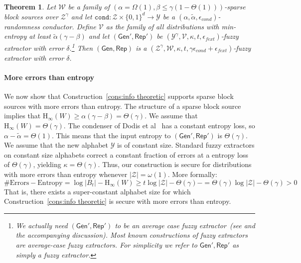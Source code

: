 \documentclass[11pt]{article}
\newtheorem{theorem}{Theorem}[section]
\newcommand{\consref}[1]{\mbox{Construction~\ref{#1}}}
\newcommand{\class}[1]{{\ensuremath{\mathsf{#1}}}}
\newcommand{\gen}{\ensuremath{\class{Gen}}\xspace}
\newcommand{\rep}{\ensuremath{\class{Rep}}\xspace}
\newcommand{\zo}{\ensuremath{\{0, 1\}}}
\newcommand{\Hoo}{\mathrm{H}_\infty}
\newcommand{\cond}{\ensuremath{\mathtt{cond}}}
\begin{document}
\begin{theorem}
\label{thm:info theory sec}
Let $\mathcal{W}$ be a family of $(\alpha = \Omega(1), \beta\leq \gamma(1-\Theta(1)))$-sparse block sources over $\mathcal{Z}^\gamma$ and let $\cond: \mathcal{Z} \times \zo^d\rightarrow \mathcal{Y}$ be a $(\alpha, \tilde{\alpha}, \epsilon_{cond})$-randomness conductor.  Define $\mathcal{V}$ as the family of all distributions with min-entropy at least $\tilde{\alpha}(\gamma-\beta)$ and let $(\gen', \rep')$ be $(\mathcal{Y}^\gamma, \mathcal{V}, \kappa, t, \epsilon_{fext})$-fuzzy extractor with error $\delta$.\footnote{We actually need $(\gen', \rep')$ to be an average case fuzzy extractor~(see \cite[Definition 4]{DBLP:journals/siamcomp/DodisORS08} and the accompanying discussion).  Most known constructions of fuzzy extractors are average-case fuzzy extractors.  For simplicity we refer to $\gen', \rep'$ as simply a fuzzy extractor.}  Then $(\gen, \rep)$ is a $(\mathcal{Z}^\gamma, \mathcal{W}, \kappa, t, \gamma\epsilon_{cond}+\epsilon_{fext})$-fuzzy extractor with error $\delta$.
\end{theorem}

\paragraph{More errors than entropy}

We now show that \consref{cons:info theoretic} supports sparse block sources with more errors than entropy.  The structure of a sparse block source implies that  $\Hoo(W) \ge \alpha (\gamma-\beta ) = \Theta(\gamma)$.  We assume that $\Hoo(W) = \Theta(\gamma)$. The condenser of Dodis et al~\cite{dodis2014key} has a constant entropy loss, so $\alpha-\tilde{\alpha} = \Theta(1)$. This means that the input entropy to $(\gen', \rep')$ is $\Theta(\gamma)$.   We assume that the new alphabet $\mathcal{Y}$ is of constant size.  Standard fuzzy extractors on constant size alphabets correct a constant fraction of errors at a entropy loss of $\Theta(\gamma)$, yielding $\kappa = \Theta(\gamma)$.  Thus, our construction is secure for distributions with more errors than entropy whenever $|\mathcal{Z}| = \omega(1)$.
More formally:
\[
\text{\# Errors} - \text{Entropy} = \log |B_t| - \Hoo(W) \ge  t \log |\mathcal{Z}| - \Theta(\gamma)-= \Theta(\gamma) \log |\mathcal{Z}| - \Theta(\gamma)  > 0
\]
That is, there exists a super-constant alphabet size for which \consref{cons:info theoretic} is secure with more errors than entropy.
\end{document}
